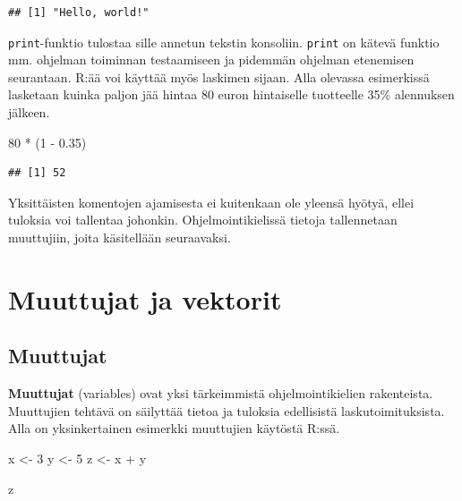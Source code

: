 \documentclass[
]{book}
\newenvironment{Shaded}{\begin{snugshade}}{\end{snugshade}}
\newcommand{\DecValTok}[1]{\textcolor[rgb]{0.00,0.00,0.81}{#1}}
\newcommand{\FloatTok}[1]{\textcolor[rgb]{0.00,0.00,0.81}{#1}}
\newcommand{\NormalTok}[1]{#1}
\newcommand{\OtherTok}[1]{\textcolor[rgb]{0.56,0.35,0.01}{#1}}
\newcommand{\SpecialCharTok}[1]{\textcolor[rgb]{0.00,0.00,0.00}{#1}}
\begin{document}
\begin{verbatim}
## [1] "Hello, world!"
\end{verbatim}

\texttt{print}-funktio tulostaa sille annetun tekstin konsoliin. \texttt{print} on kätevä funktio mm. ohjelman toiminnan testaamiseen ja pidemmän ohjelman etenemisen seurantaan. R:ää voi käyttää myös laskimen sijaan. Alla olevassa esimerkissä lasketaan kuinka paljon jää hintaa 80 euron hintaiselle tuotteelle 35\% alennuksen jälkeen.

\begin{Shaded}
\begin{Highlighting}[]
\DecValTok{80} \SpecialCharTok{*}\NormalTok{ (}\DecValTok{1} \SpecialCharTok{{-}} \FloatTok{0.35}\NormalTok{)}
\end{Highlighting}
\end{Shaded}

\begin{verbatim}
## [1] 52
\end{verbatim}

Yksittäisten komentojen ajamisesta ei kuitenkaan ole yleensä hyötyä, ellei tuloksia voi tallentaa johonkin. Ohjelmointikielissä tietoja tallennetaan muuttujiin, joita käsitellään seuraavaksi.

\hypertarget{variables_and_vectors}{%
\chapter{Muuttujat ja vektorit}\label{variables_and_vectors}}

\hypertarget{variables}{%
\section{Muuttujat}\label{variables}}

\textbf{Muuttujat} (variables) ovat yksi tärkeimmistä ohjelmointikielien rakenteista. Muuttujien tehtävä on säilyttää tietoa ja tuloksia edellisistä laskutoimituksista. Alla on yksinkertainen esimerkki muuttujien käytöstä R:ssä.

\begin{Shaded}
\begin{Highlighting}[]
\NormalTok{x }\OtherTok{\textless{}{-}} \DecValTok{3}
\NormalTok{y }\OtherTok{\textless{}{-}} \DecValTok{5}
\NormalTok{z }\OtherTok{\textless{}{-}}\NormalTok{ x }\SpecialCharTok{+}\NormalTok{ y}

\NormalTok{z}
\end{Highlighting}
\end{Shaded}
\end{document}
